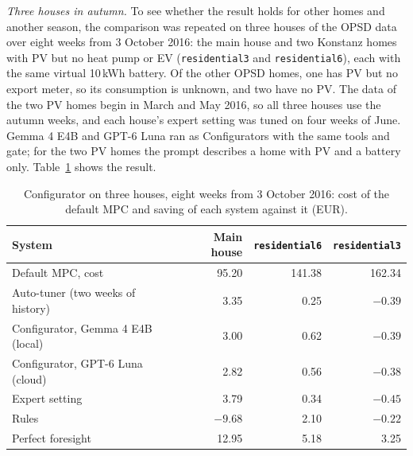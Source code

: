 \documentclass[12pt,a4paper]{report}
\begin{document}
\textit{Three houses in autumn.} To see whether the result holds for
other homes and another season, the comparison was repeated on three
houses of the OPSD data over eight weeks from 3 October 2016: the main
house and two Konstanz homes with PV but no heat pump or EV
(\texttt{residential3} and \texttt{residential6}), each with the same
virtual 10\,kWh battery. Of the other OPSD homes, one has PV but no
export meter, so its consumption is unknown, and two have no PV. The
data of the two PV homes begin in March and May 2016, so all three
houses use the autumn weeks, and each house's expert setting was tuned
on four weeks of June. Gemma 4 E4B and GPT-6 Luna ran as Configurators
with the same tools and gate; for the two PV homes the prompt describes
a home with PV and a battery only. Table~\ref{tab:confighouses} shows
the result.

\begin{table}[htbp]
\caption{Configurator on three houses, eight weeks from 3 October 2016:
cost of the default MPC and saving of each system against it (EUR).}
\label{tab:confighouses}
\small
\begin{tabularx}{\textwidth}{@{}Xrrr@{}}
\toprule
System & Main house & \texttt{residential6} & \texttt{residential3} \\
\midrule
Default MPC, cost & 95.20 & 141.38 & 162.34 \\
\midrule
Auto-tuner (two weeks of history) & 3.35 & 0.25 & $-0.39$ \\
Configurator, Gemma 4 E4B (local) & 3.00 & 0.62 & $-0.39$ \\
Configurator, GPT-6 Luna (cloud) & 2.82 & 0.56 & $-0.38$ \\
Expert setting & 3.79 & 0.34 & $-0.45$ \\
Rules & $-9.68$ & 2.10 & $-0.22$ \\
Perfect foresight & 12.95 & 5.18 & 3.25 \\
\bottomrule
\end{tabularx}
\end{table}
\end{document}
